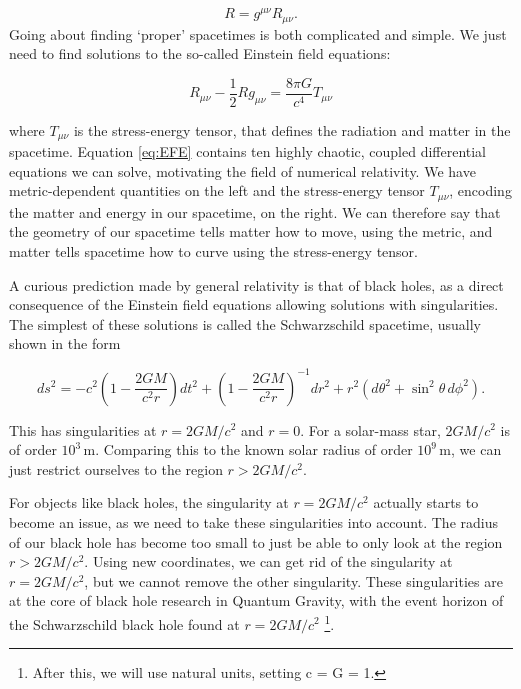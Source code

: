 \documentclass[twoside, openright]{RadboudReport}
\newcommand{\mn}{{\mu\nu}}
\begin{document}
\begin{equation*}
	R = g^\mn R_\mn.
\end{equation*}
Going about finding `proper' spacetimes is both complicated and simple. We just need to find solutions to the so-called Einstein field equations:

\begin{equation}
	R_\mn - \frac{1}{2}Rg_\mn = \frac{8\pi G}{c^4}T_\mn 
	\label{eq:EFE}
\end{equation}

where $T_\mn$ is the stress-energy tensor, that defines the radiation and matter in the spacetime. Equation \ref{eq:EFE} contains ten highly chaotic, coupled differential equations we can solve, motivating the field of numerical relativity. We have metric-dependent quantities on the left and the stress-energy tensor $T_\mn$, encoding the matter and energy in our spacetime, on the right.  We can therefore say that the geometry of our spacetime tells matter how to move, using the metric, and matter tells spacetime how to curve using the stress-energy tensor.\newline

A curious prediction made by general relativity is that of black holes, as a direct consequence of the Einstein field equations allowing solutions with singularities. The simplest of these solutions is called the Schwarzschild spacetime, usually shown in the form

\begin{equation}
	ds^2 = - c^2\left(1 - \frac{2GM}{c^2r}\right) dt^2 + \left(1 - \frac{2GM}{c^2r}\right)^{-1} dr^2 + r^2 (d\theta^2 + \sin^2\theta \, d\phi^2).
	\label{eq:schwmetric}
\end{equation}

This has singularities at $r = 2GM/c^2$ and $r = 0$. For a solar-mass star, $2GM/c^2$ is of order $10^3 \, \text{m}$. Comparing this to the known solar radius of order $10^9 \, \text{m}$, we can just restrict ourselves to the region $r > 2GM/c^2$. \newline

For objects like black holes, the singularity at $r = 2GM/c^2$ actually starts to become an issue, as we need to take these singularities into account. The radius of our black hole has become too small to just be able to only look at the region $r > 2GM/c^2$. Using new coordinates, we can get rid of the singularity at $r = 2GM/c^2$, but we cannot remove the other singularity. These singularities are at the core of black hole research in Quantum Gravity, with the event horizon of the Schwarzschild black hole found at $r = 2GM/c^2$ \footnote{After this, we will use natural units, setting c = G = 1.}.\newline
\end{document}

